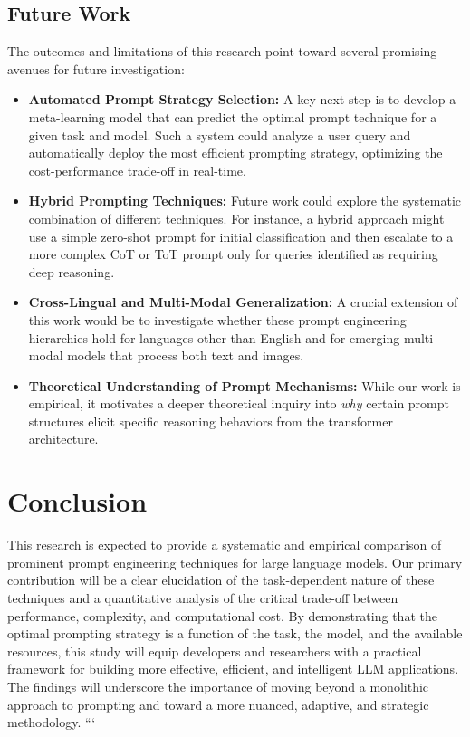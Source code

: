 \documentclass{article}
\begin{document}
\subsection{Future Work}
The outcomes and limitations of this research point toward several promising avenues for future investigation:
\begin{itemize}
    \item \textbf{Automated Prompt Strategy Selection:} A key next step is to develop a meta-learning model that can predict the optimal prompt technique for a given task and model. Such a system could analyze a user query and automatically deploy the most efficient prompting strategy, optimizing the cost-performance trade-off in real-time.
    \item \textbf{Hybrid Prompting Techniques:} Future work could explore the systematic combination of different techniques. For instance, a hybrid approach might use a simple zero-shot prompt for initial classification and then escalate to a more complex CoT or ToT prompt only for queries identified as requiring deep reasoning.
    \item \textbf{Cross-Lingual and Multi-Modal Generalization:} A crucial extension of this work would be to investigate whether these prompt engineering hierarchies hold for languages other than English and for emerging multi-modal models that process both text and images.
    \item \textbf{Theoretical Understanding of Prompt Mechanisms:} While our work is empirical, it motivates a deeper theoretical inquiry into \textit{why} certain prompt structures elicit specific reasoning behaviors from the transformer architecture.
\end{itemize}

\section{Conclusion}

This research is expected to provide a systematic and empirical comparison of prominent prompt engineering techniques for large language models. Our primary contribution will be a clear elucidation of the task-dependent nature of these techniques and a quantitative analysis of the critical trade-off between performance, complexity, and computational cost. By demonstrating that the optimal prompting strategy is a function of the task, the model, and the available resources, this study will equip developers and researchers with a practical framework for building more effective, efficient, and intelligent LLM applications. The findings will underscore the importance of moving beyond a monolithic approach to prompting and toward a more nuanced, adaptive, and strategic methodology.
```
\end{document}
